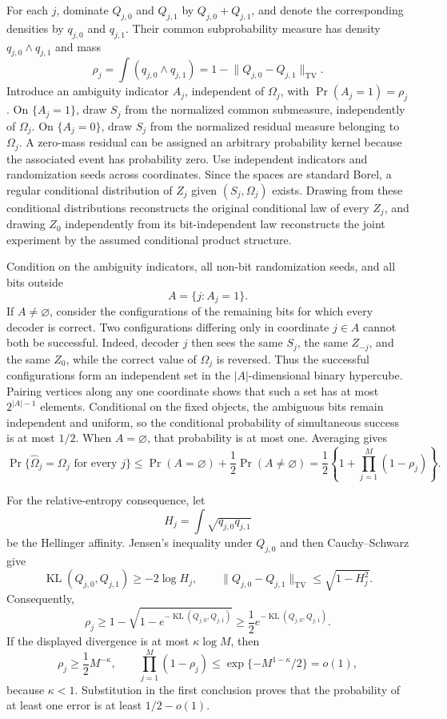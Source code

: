 For each \(j\), dominate \(Q_{j,0}\) and \(Q_{j,1}\) by \(Q_{j,0}+Q_{j,1}\), and denote the corresponding densities by \(q_{j,0}\) and \(q_{j,1}\).  Their common subprobability measure has density \(q_{j,0}\wedge q_{j,1}\) and mass
\[
 \rho_j=\int(q_{j,0}\wedge q_{j,1})
 =1-\lVert Q_{j,0}-Q_{j,1}\rVert_{\mathrm{TV}}.
\]
Introduce an ambiguity indicator \(A_j\), independent of \(\Omega_j\), with \(\Pr(A_j=1)=\rho_j\).  On \(\{A_j=1\}\), draw \(S_j\) from the normalized common submeasure, independently of \(\Omega_j\).  On \(\{A_j=0\}\), draw \(S_j\) from the normalized residual measure belonging to \(\Omega_j\).  A zero-mass residual can be assigned an arbitrary probability kernel because the associated event has probability zero.  Use independent indicators and randomization seeds across coordinates.  Since the spaces are standard Borel, a regular conditional distribution of \(Z_j\) given \((S_j,\Omega_j)\) exists.  Drawing from these conditional distributions reconstructs the original conditional law of every \(Z_j\), and drawing \(Z_0\) independently from its bit-independent law reconstructs the joint experiment by the assumed conditional product structure.

Condition on the ambiguity indicators, all non-bit randomization seeds, and all bits outside
\[
 A=\{j:A_j=1\}.
\]
If \(A\neq\varnothing\), consider the configurations of the remaining bits for which every decoder is correct.  Two configurations differing only in coordinate \(j\in A\) cannot both be successful.  Indeed, decoder \(j\) then sees the same \(S_j\), the same \(Z_{-j}\), and the same \(Z_0\), while the correct value of \(\Omega_j\) is reversed.  Thus the successful configurations form an independent set in the \(|A|\)-dimensional binary hypercube.  Pairing vertices along any one coordinate shows that such a set has at most \(2^{|A|-1}\) elements.  Conditional on the fixed objects, the ambiguous bits remain independent and uniform, so the conditional probability of simultaneous success is at most \(1/2\).  When \(A=\varnothing\), that probability is at most one.  Averaging gives
\[
 \Pr\{\widehat\Omega_j=\Omega_j\text{ for every }j\}
 \leq \Pr(A=\varnothing)+\frac12\Pr(A\neq\varnothing)
 =\frac12\left\{1+\prod_{j=1}^M(1-\rho_j)\right\}.
\]

For the relative-entropy consequence, let
\[
 H_j=\int\sqrt{q_{j,0}q_{j,1}}
\]
be the Hellinger affinity.  Jensen's inequality under \(Q_{j,0}\) and then Cauchy--Schwarz give
\[
 \operatorname{KL}(Q_{j,0},Q_{j,1})\geq-2\log H_j,
 \qquad
 \lVert Q_{j,0}-Q_{j,1}\rVert_{\mathrm{TV}}
 \leq\sqrt{1-H_j^2}.
\]
Consequently,
\[
 \rho_j
 \geq1-\sqrt{1-e^{-\operatorname{KL}(Q_{j,0},Q_{j,1})}}
 \geq\frac12e^{-\operatorname{KL}(Q_{j,0},Q_{j,1})}.
\]
If the displayed divergence is at most \(\kappa\log M\), then
\[
 \rho_j\geq\frac12M^{-\kappa},
 \qquad
 \prod_{j=1}^M(1-\rho_j)
 \leq\exp\{-M^{1-\kappa}/2\}=o(1),
\]
because \(\kappa<1\).  Substitution in the first conclusion proves that the probability of at least one error is at least \(1/2-o(1)\).